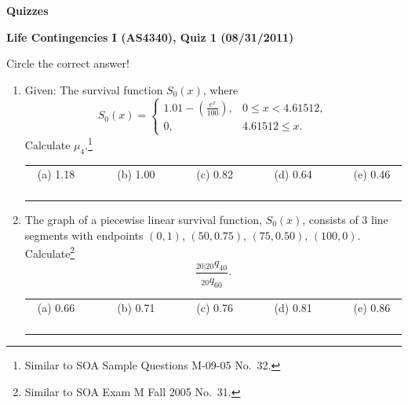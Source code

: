 \documentclass[11pt,fleqn,oneside]{book}
\begin{document}
\appendix
\thispagestyle{empty}
\chapter[Quiz]{}
\thispagestyle{empty}
\vspace{3cm}
\begin{center}
{\Huge \bf Quizzes}
\end{center}

\newpage

\thispagestyle{empty}
\setcounter{page}{1}
\begin{center}
{ \large \bf Life Contingencies I (AS4340), Quiz 1 (08/31/2011)}
\end{center}
\noindent
Circle the correct answer!
\begin{enumerate}
\item
Given: The survival function $S_0(x)$, where
$$
S_0(x) = \left\{
\begin{array}{ll}
1.01 - \left(\frac{e^x}{100}\right), & 0 \leq x < 4.61512, \\
0, & 4.61512 \leq x.
\end{array}
\right. 
$$
Calculate $\mu_4$.\footnote[1]{Similar to SOA Sample Questions M-09-05 No.\ 32.}

\vspace{0.35cm}
\small
\begin{center}
\begin{tabular}{c c c c c}
(a) 1.18$\;\;\;\;\;\;$ & 
$\;\;\;\;\;\;$(b) 1.00$\;\;\;\;\;\;$ & 
$\;\;\;\;\;\;$(c) 0.82$\;\;\;\;\;\;$ &
$\;\;\;\;\;\;$(d) 0.64$\;\;\;\;\;\;$ &
$\;\;\;\;\;\;$(e) 0.46$\;\;\;\;\;\;$
\end{tabular}
\end{center}
\vspace{0.2cm}

\normalsize
\item The graph of a piecewise linear survival function, $S_0(x)$, consists of 3 line segments with endpoints $(0,1)$, $(50,0.75)$, $(75,0.50)$, $(100,0)$. Calculate\footnote[2]{Similar to SOA Exam M Fall 2005 No.\ 31.} 
$$
\frac{_{20|20}q_{40}}{_{20}q_{60}}.
$$

\vspace{0.35cm}
\small
\begin{center}
\begin{tabular}{c c c c c}
(a) 0.66$\;\;\;\;\;\;$ & 
$\;\;\;\;\;\;$(b) 0.71$\;\;\;\;\;\;$ & 
$\;\;\;\;\;\;$(c) 0.76$\;\;\;\;\;\;$ &
$\;\;\;\;\;\;$(d) 0.81$\;\;\;\;\;\;$ &
$\;\;\;\;\;\;$(e) 0.86$\;\;\;\;\;\;$
\end{tabular}
\end{center}
\vspace{0.2cm}


\end{enumerate}
\end{document}
